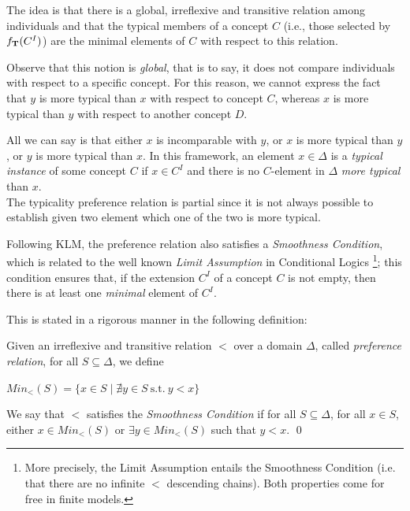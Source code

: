 \documentclass[a4paper, 11pt, oneside]{duthesis}
\newcommand{\tip}{{\bf T}}
\newcommand{\tc} {\mid}
\newenvironment{definition}
{\begin{defi} \rm}{\qed \end{defi}}
\newenvironment{definition}
{\begin{defi} \rm}{\qed \end{defi}}
\newtheorem{definition}{Definition}
\newcounter{posu}
\newtheorem{definition}[posu]{Definition}
\begin{document}
The idea is that there is a global, irreflexive and transitive relation among individuals and that the typical members of a concept $C$ (i.e., those selected by $f_\tip(C^I)$) are the minimal elements of $C$ with respect to this relation.

Observe that this notion is \emph{global}, that is to say, it does not compare individuals with respect to a specific concept.
For this reason,  we cannot express the fact that $y$ is more typical than $x$ with respect to concept $C$, whereas $x$ is more typical than $y$ with respect to another concept $D$.

All we can say is that either $x$ is incomparable with $y$, or $x$ is more typical than $y$, or $y$ is more typical than $x$.
In this framework, an element $x \in \Delta$ is a {\em typical instance} of some concept $C$ if $x \in C^I$ and there is no $C$-element in $\Delta$ {\em more typical} than $x$.\\


The typicality preference relation is partial since it is not always possible to establish given two element which one of the two is more typical.

Following KLM, the preference relation also satisfies a \emph{Smoothness Condition}, which is related to the well known \emph{Limit Assumption} in Conditional Logics \cite{Nute80}
\footnote{More precisely, the Limit Assumption entails the Smoothness Condition (i.e. that there are no infinite $<$ descending chains). Both properties come for free in finite models.};
this condition ensures that, if the extension $C^I$ of a concept $C$ is not empty, then there is at least one \emph{minimal} element of $C^I$.

\newpage

This is stated in a rigorous manner in the following definition:

\begin{definition}\label{Definition of $<$} Given an irreflexive and transitive relation  $<$ over a domain $\Delta$, called \emph{preference relation}, for all $S \subseteq \Delta$, we define

\begin{center}$Min_<(S)= \{x \in S \tc \nexists y \in S \ \mbox{s.t.} \ y < x \}$\end{center}

\noindent We say that $<$ satisfies the {\em Smoothness Condition} if for all $S \subseteq \Delta$, for all $x \in S$, either $x \in Min_<(S)$ or $\exists y \in  Min_<(S)$ such that $y < x$.
\end{definition}
\end{document}
